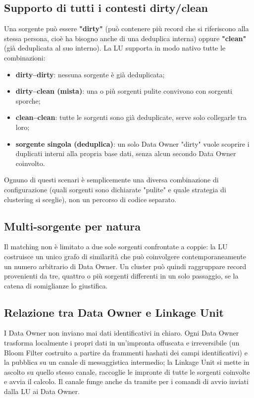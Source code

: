 \documentclass[11pt,a4paper]{article}
\begin{document}
\subsection{Supporto di tutti i contesti dirty/clean}

Una sorgente pu\`o essere \textbf{"dirty"} (pu\`o contenere pi\`u record che si
riferiscono alla stessa persona, cio\`e ha bisogno anche di una deduplica
interna) oppure \textbf{"clean"} (gi\`a deduplicata al suo interno). La LU
supporta in modo nativo tutte le combinazioni:

\begin{itemize}[nosep]
    \item \textbf{dirty--dirty}: nessuna sorgente \`e gi\`a deduplicata;
    \item \textbf{dirty--clean (mista)}: una o pi\`u sorgenti pulite convivono
        con sorgenti sporche;
    \item \textbf{clean--clean}: tutte le sorgenti sono gi\`a deduplicate,
        serve solo collegarle tra loro;
    \item \textbf{sorgente singola (deduplica)}: un solo Data Owner "dirty"
        vuole scoprire i duplicati interni alla propria base dati, senza alcun
        secondo Data Owner coinvolto.
\end{itemize}

Ognuno di questi scenari \`e semplicemente una diversa combinazione di
configurazione (quali sorgenti sono dichiarate "pulite" e quale strategia di
clustering si sceglie), non un percorso di codice separato.

\subsection{Multi-sorgente per natura}

Il matching non \`e limitato a due sole sorgenti confrontate a coppie: la LU
costruisce un unico grafo di similarit\`a che pu\`o coinvolgere
contemporaneamente un numero arbitrario di Data Owner. Un cluster pu\`o quindi
raggruppare record provenienti da tre, quattro o pi\`u sorgenti differenti in
un solo passaggio, se la catena di somiglianze lo giustifica.

\subsection{Relazione tra Data Owner e Linkage Unit}

I Data Owner non inviano mai dati identificativi in chiaro. Ogni Data Owner
trasforma localmente i propri dati in un'impronta offuscata e irreversibile
(un Bloom Filter costruito a partire da frammenti hashati dei campi
identificativi) e la pubblica su un canale di messaggistica intermedio; la
Linkage Unit si mette in ascolto su quello stesso canale, raccoglie le
impronte di tutte le sorgenti coinvolte e avvia il calcolo. Il canale funge
anche da tramite per i comandi di avvio inviati dalla LU ai Data Owner.
\end{document}
